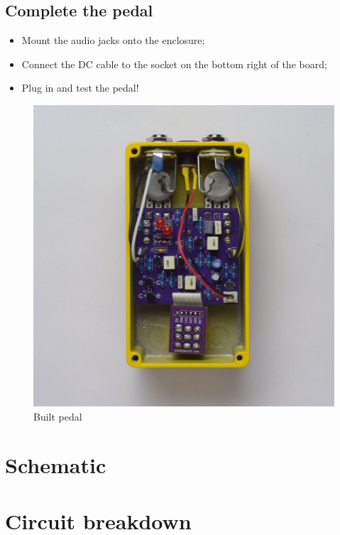 \documentclass[a4paper,12pt]{article}
\begin{document}
\pagebreak

\subsection{Complete the pedal}

\begin{itemize}
  \item Mount the audio jacks onto the enclosure;
  \item Connect the DC cable to the socket on the bottom
    right of the board;
  \item Plug in and test the pedal!
\end{itemize}


\begin{figure}[h!]
  \begin{center}
    \includegraphics[width=\textwidth]{build/20-built-1000px.jpg}
  \end{center}
  \caption{Built pedal}
\end{figure}

\pagebreak

\section{Schematic}
\label{sec:schematic}

\section{Circuit breakdown}
\label{sec:circuit}
\end{document}
